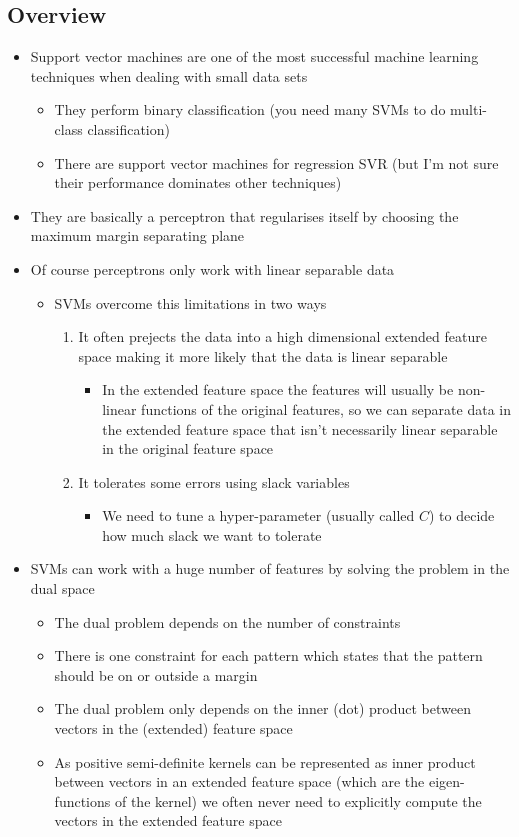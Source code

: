 \documentclass[11pt]{article}
\begin{document}
\subsection{Overview}
\label{sec:org2514079}
\begin{itemize}
\item Support vector machines are one of the most successful machine
learning techniques when dealing with small data sets
\begin{itemize}
\item They perform binary classification (you need many SVMs to do
multi-class classification)
\item There are support vector machines for regression SVR (but I'm
not sure their performance dominates other techniques)
\end{itemize}
\item They are basically a perceptron that regularises itself by
choosing the maximum margin separating plane
\item Of course perceptrons only work with linear separable data
\begin{itemize}
\item SVMs overcome this limitations in two ways
\begin{enumerate}
\item It often prejects the data into a high dimensional extended
feature space making it more likely that the data is linear separable
\begin{itemize}
\item In the extended feature space the features will usually be
non-linear functions of the original features, so we can
separate data in the extended feature space that isn't
necessarily linear separable in the original feature space
\end{itemize}
\item It tolerates some errors using slack variables
\begin{itemize}
\item We need to tune a hyper-parameter (usually called \(C\)) to
decide how much slack we want to tolerate
\end{itemize}
\end{enumerate}
\end{itemize}
\item SVMs can work with a huge number of features by solving the
problem in the dual space
\begin{itemize}
\item The dual problem depends on the number of constraints
\item There is one constraint for each pattern which states that the
pattern should be on or outside a margin
\item The dual problem only depends on the inner (dot) product
between vectors in the (extended) feature space
\item As positive semi-definite kernels can be represented as inner
product between vectors in an extended feature space (which are
the eigen-functions of the kernel) we often never need to
explicitly compute the vectors in the extended feature space
\end{itemize}
\end{itemize}
\end{document}
